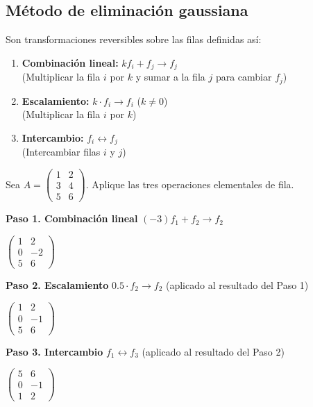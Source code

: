 \subsection{Método de eliminación gaussiana}

\begin{definition}
Son transformaciones reversibles sobre las filas definidas así:
\begin{enumerate}
\item \textbf{Combinación lineal:} $k f_i + f_j \to f_j$ \\
  (Multiplicar la fila $i$ por $k$ y sumar a la fila $j$ para cambiar $f_j$)
  
\item \textbf{Escalamiento:} $k \cdot f_i \to f_i$ \quad ($k \neq 0$) \\
  (Multiplicar la fila $i$ por $k$)

\item \textbf{Intercambio:} $f_i \leftrightarrow f_j$ \\
  (Intercambiar filas $i$ y $j$)
\end{enumerate}
\end{definition}

\begin{example}
Sea $A = \begin{pmatrix} 1 & 2 \\ 3 & 4 \\ 5 & 6 \end{pmatrix}$. Aplique las tres operaciones elementales de fila.
\begin{myproof}
\textbf{Paso 1. Combinación lineal} $(-3)f_1 + f_2 \to f_2$

$\begin{pmatrix} 1 & 2 \\ 0 & -2 \\ 5 & 6 \end{pmatrix}$

\textbf{Paso 2. Escalamiento} $0.5 \cdot f_2 \to f_2$ (aplicado al resultado del Paso 1)

$\begin{pmatrix} 1 & 2 \\ 0 & -1 \\ 5 & 6 \end{pmatrix}$

\textbf{Paso 3. Intercambio} $f_1 \leftrightarrow f_3$ (aplicado al resultado del Paso 2)

$\boxed{\begin{pmatrix} 5 & 6 \\ 0 & -1 \\ 1 & 2 \end{pmatrix}}$
\end{myproof}
\end{example}

